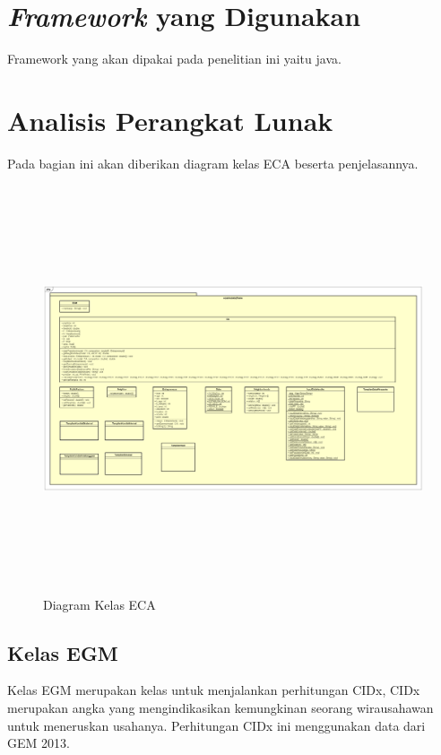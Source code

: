 \section{\textit{Framework} yang Digunakan}
\label{framework}
Framework yang akan dipakai pada penelitian ini yaitu java.
	
	
\section{Analisis Perangkat Lunak}
\label{analisisPL}
Pada bagian ini akan diberikan diagram kelas ECA beserta penjelasannya.

	\begin{figure} [H]
		\centering  
		\includegraphics[width=18cm, height=12cm]{ClassDiagram3} 
		\caption[Diagram Kelas ECA]{Diagram Kelas ECA} 
		\label{fig:CD1} 
	\end{figure}
	

\subsection{Kelas EGM}
	Kelas EGM merupakan kelas untuk menjalankan perhitungan CIDx, CIDx merupakan angka yang mengindikasikan kemungkinan seorang wirausahawan untuk meneruskan usahanya. Perhitungan CIDx ini menggunakan data dari GEM 2013.
	
